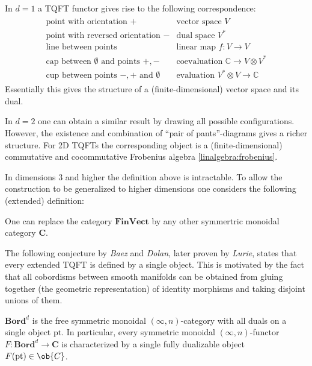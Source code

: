     \begin{example}[1D]
        In $d=1$ a TQFT functor gives rise to the following correspondence:
        \begin{gather*}
            \begin{array}{l|l}
                \text{point with orientation } + & \text{vector space } V\\
                \text{point with reversed orientation } - & \text{dual space }V^*\\
                \text{line between points} & \text{linear map }f:V\rightarrow V\\
                \text{cap between $\emptyset$ and points } +,- & \text{coevaluation } \mathbb{C}\rightarrow V\otimes V^*\\
                \text{cup between points $-,+$ and }\emptyset & \text{evaluation }V^*\otimes V\rightarrow\mathbb{C}
            \end{array}
        \end{gather*}
        Essentially this gives the structure of a (finite-dimensional) vector space and its dual.
    \end{example}

    \begin{example}[2D]
        In $d=2$ one can obtain a similar result by drawing all possible configurations. However, the existence and combination of ``pair of pants''-diagrams gives a richer structure. For 2D TQFTs the corresponding object is a (finite-dimensional) commutative and cocommutative Frobenius algebra \ref{linalgebra:frobenius}.
    \end{example}

    In dimensions 3 and higher the definition above is intractable. To allow the construction to be generalized to higher dimensions one considers the following (extended) definition:

    \begin{remark}
        One can replace the category $\mathbf{FinVect}$ by any other symmertric monoidal category $\mathbf{C}$.
    \end{remark}

    The following conjecture by \textit{Baez} and \textit{Dolan}, later proven by \textit{Lurie}, states that every extended TQFT is defined by a single object. This is motivated by the fact that all cobordisms between smooth manifolds can be obtained from gluing together (the geometric representation) of identity morphisms and taking disjoint unions of them.
    \begin{theorem}
        $\mathbf{Bord}^d$ is the free symmetric monoidal $(\infty,n)$-category with all duals on a single object $\mathrm{pt}$. In particular, every symmetric monoidal $(\infty,n)$-functor $F:\mathbf{Bord}^d\rightarrow\mathbf{C}$ is characterized by a single fully dualizable object $F(\mathrm{pt})\in\ob{C}$.
    \end{theorem}

